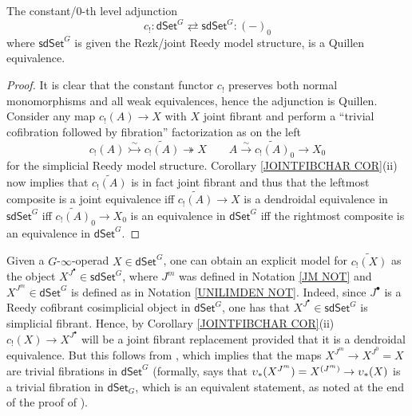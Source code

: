 \documentclass[a4paper,10pt
]{article}%
\begin{document}
\begin{theorem}\label{INC0AGJ THM}
	The constant/$0$-th level adjunction
	\[
	c_!\colon 
	\mathsf{dSet}^G \rightleftarrows \mathsf{sdSet}^G
	\colon (-)_0
	\]
	where $\mathsf{sdSet}^G$ is given the Rezk/joint Reedy model structure,
	is a Quillen equivalence.
\end{theorem}

\begin{proof}
	It is clear that the constant functor $c_!$ preserves both normal monomorphisms and all weak equivalences, hence the adjunction is Quillen. 
	Consider any map $c_!(A) \to X$ with $X$ joint fibrant and perform a ``trivial cofibration followed by fibration'' factorization as on the left
\[
c_!(A) \overset{\sim}{\rightarrowtail} \widetilde{c_!(A)} \twoheadrightarrow X
	\qquad
A \xrightarrow{\sim} \widetilde{c_!(A)}_0 \to X_0
\]
	for the simplicial Reedy model structure. 
	Corollary \ref{JOINTFIBCHAR COR}(ii) now implies that 
	$\widetilde{c_!(A)}$ is in fact joint fibrant
	and thus that the leftmost composite is a joint equivalence iff $\widetilde{c_!(A)} \to X$ is a dendroidal equivalence in $\mathsf{sdSet}^G$ iff $\widetilde{c_!(A)}_0 \to X_0$ is an equivalence in  $\mathsf{dSet}^G$ iff the rightmost composite is an equivalence in $\mathsf{dSet}^G$.
\end{proof}


\begin{remark}\label{CONCRECOM REM}
      Given a $G$-$\infty$-operad $X \in \mathsf{dSet}^G$,
      one can obtain an explicit model for $\widetilde{c_{!} (X)}$
      as the object $X^{J^{\bullet}} \in \mathsf{sdSet}^G$,
      where $J^{m}$ was defined in Notation \ref{JM NOT}
      and $X^{J^m}\in \mathsf{dSet}^G$ is defined as in 
      Notation \ref{UNILIMDEN NOT}.
      Indeed, since $J^{\bullet}$ is a Reedy cofibrant cosimplicial object in $\mathsf{dSet}^G$,
      one has that $X^{J^{\bullet}} \in \mathsf{sdSet}^G$
      is simplicial fibrant.
      Hence, by Corollary \ref{JOINTFIBCHAR COR}(ii)
      $c_{!}(X) \to X^{J^{\bullet}}$
      will be a joint fibrant replacement provided that it is a dendroidal equivalence.
      But this follows from \cite[Cor. 8.21]{Per17},
      which implies that the maps $X^{J^m} \to X^{J^0}=X$
      are trivial fibrations in $\mathsf{dSet}^G$
      (formally, \cite[Cor. 8.21]{Per17} says that $\upsilon_{\**}(X^{J^m}) = X^{(J^m)} \to \upsilon_{\**}(X)$
      is a trivial fibration in $\mathsf{dSet}_G$, which is an equivalent statement, as noted at the end of the proof of \cite[Thm. 8.22]{Per17}).
%
\end{remark}
\end{document}
